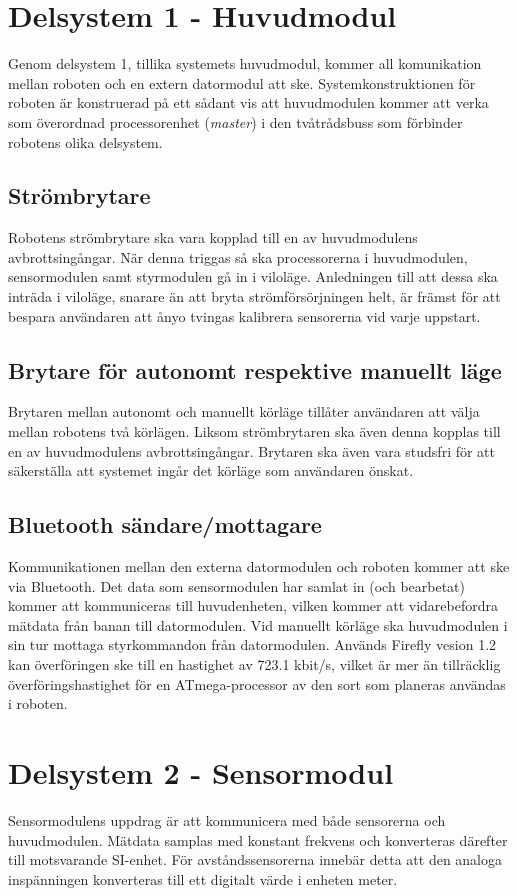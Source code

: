 \documentclass[11pt]{article}
\begin{document}
\begin{flushleft}
\pagebreak
\section{Delsystem 1 - Huvudmodul}
\label{sec:huvudmodul}
Genom delsystem 1, tillika systemets huvudmodul, kommer all komunikation mellan roboten och en extern datormodul att ske. Systemkonstruktionen för roboten är konstruerad på ett sådant vis att huvudmodulen kommer att verka som överordnad processorenhet (\emph{master}) i den tvåtrådsbuss som förbinder robotens olika delsystem. 
\subsection{Strömbrytare}
Robotens strömbrytare ska vara kopplad till en av huvudmodulens avbrottsingångar. När denna triggas så ska processorerna i huvudmodulen, sensormodulen samt styrmodulen gå in i viloläge. Anledningen till att dessa ska inträda i viloläge, snarare än att bryta strömförsörjningen helt, är främst för att bespara användaren att ånyo tvingas kalibrera sensorerna vid varje uppstart.
\subsection{Brytare för autonomt respektive manuellt läge}
Brytaren mellan autonomt och manuellt körläge tillåter användaren att välja mellan robotens två körlägen. Liksom strömbrytaren ska även denna kopplas till en av huvudmodulens avbrottsingångar. Brytaren ska även vara studsfri för att säkerställa att systemet ingår det körläge som användaren önskat.
\subsection{Bluetooth\textsuperscript{\circledR} sändare/mottagare} \label{bluetooth} 
Kommunikationen mellan den externa datormodulen och roboten kommer att ske via Bluetooth\textsuperscript{\circledR}. Det data som sensormodulen har samlat in (och bearbetat) kommer att kommuniceras till huvudenheten, vilken kommer att vidarebefordra mätdata från banan till datormodulen. Vid manuellt körläge ska huvudmodulen i sin tur mottaga styrkommandon från datormodulen. Används Firefly vesion 1.2 kan överföringen ske till en hastighet av 723.1 kbit/s, vilket är mer än tillräcklig överföringshastighet för en ATmega-processor av den sort som planeras användas i roboten.


\pagebreak
\section{Delsystem 2 - Sensormodul}
\label{sec:sensormodul}
Sensormodulens uppdrag är att kommunicera med både sensorerna och huvudmodulen. Mätdata samplas med konstant frekvens och konverteras därefter till motsvarande SI-enhet. För avståndssensorerna innebär detta att den analoga inspänningen konverteras till ett digitalt värde i enheten meter.


\end{flushleft}
\end{document}
